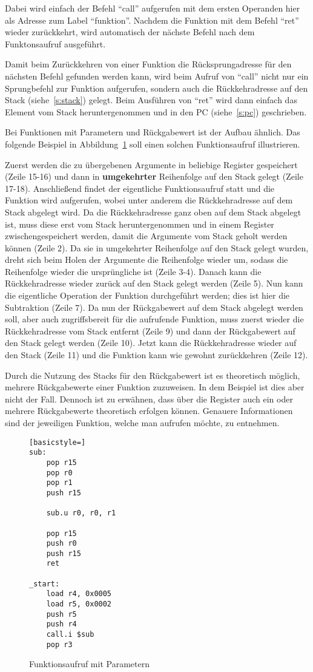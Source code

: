 Dabei wird einfach der Befehl "`call"' aufgerufen mit dem ersten Operanden hier
als Adresse zum Label "`funktion"'. Nachdem die Funktion mit dem Befehl "`ret"'
wieder zurückkehrt, wird automatisch der nächste Befehl nach dem Funktonsaufruf
ausgeführt.

Damit beim Zurückkehren von einer Funktion die Rücksprungadresse für den
nächsten Befehl gefunden werden kann, wird beim Aufruf von "`call"' nicht nur ein
Sprungbefehl zur Funktion aufgerufen, sondern auch die Rückkehradresse auf den
Stack (siehe~\ref{s:stack}) gelegt. Beim Ausführen von "`ret"' wird dann einfach
das Element vom Stack heruntergenommen und in den PC (siehe~\ref{s:pc})
geschrieben.

Bei Funktionen mit Parametern und Rückgabewert ist der Aufbau ähnlich. Das
folgende Beispiel in Abbildung~\ref{code:function_parameter} soll einen solchen
Funktionsaufruf illustrieren.

Zuerst werden die zu übergebenen Argumente in beliebige Register gespeichert
(Zeile 15-16) und dann in \textbf{umgekehrter} Reihenfolge auf den Stack gelegt
(Zeile 17-18). Anschließend findet der eigentliche Funktionsaufruf statt und die
Funktion wird aufgerufen, wobei unter anderem die Rückkehradresse auf dem Stack
abgelegt wird. Da die Rückkehradresse ganz oben auf dem Stack abgelegt ist, muss
diese erst vom Stack heruntergenommen und in einem Register zwischengespeichert
werden, damit die Argumente vom Stack geholt werden können (Zeile 2). Da sie in
umgekehrter Reihenfolge auf den Stack gelegt wurden, dreht sich beim Holen der
Argumente die Reihenfolge wieder um, sodass die Reihenfolge wieder die
ursprüngliche ist (Zeile 3-4). Danach kann die Rückkehradresse wieder zurück auf
den Stack gelegt werden (Zeile 5). Nun kann die eigentliche Operation der
Funktion durchgeführt werden; dies ist hier die Subtraktion (Zeile 7). Da nun
der Rückgabewert auf dem Stack abgelegt werden soll, aber auch zugriffsbereit
für die aufrufende Funktion, muss zuerst wieder die Rückkehradresse vom Stack
entfernt (Zeile 9) und dann der Rückgabewert auf den Stack gelegt werden (Zeile
10). Jetzt kann die Rückkehradresse wieder auf den Stack (Zeile 11) und die
Funktion kann wie gewohnt zurückkehren (Zeile 12).

Durch die Nutzung des Stacks für den Rückgabewert ist es theoretisch möglich,
mehrere Rückgabewerte einer Funktion zuzuweisen. In dem Beispiel ist dies aber
nicht der Fall. Dennoch ist zu erwähnen, dass über die Register auch ein oder
mehrere Rückgabewerte theoretisch erfolgen können. Genauere Informationen sind
der jeweiligen Funktion, welche man aufrufen möchte, zu entnehmen.
\begin{figure}[!htb]
\begin{lstlisting}[basicstyle=]
sub:
	pop r15
	pop r0
	pop r1
	push r15

	sub.u r0, r0, r1

	pop r15
	push r0
	push r15
	ret

_start:
	load r4, 0x0005
	load r5, 0x0002
	push r5
	push r4
	call.i $sub
	pop r3
\end{lstlisting}
\caption{Funktionsaufruf mit Parametern}
\label{code:function_parameter}
\end{figure}

